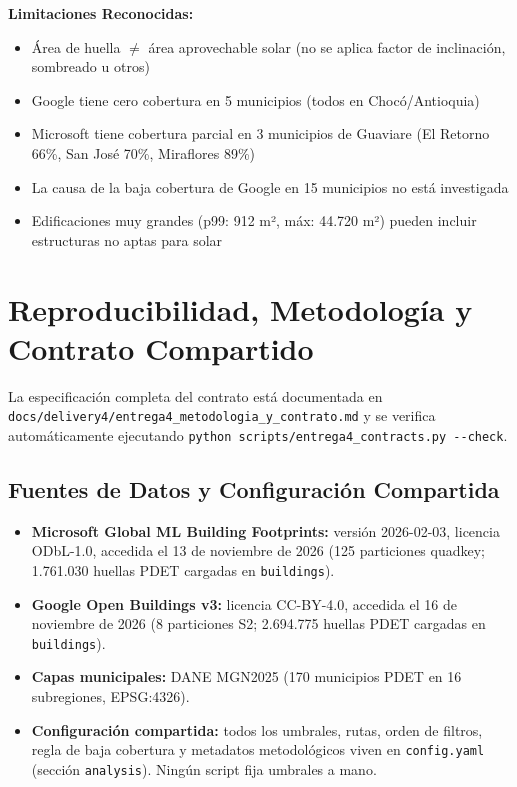 \documentclass[11pt, a4paper]{article}
\begin{document}
\textbf{Limitaciones Reconocidas:}
\begin{itemize}
    \item Área de huella $\neq$ área aprovechable solar (no se aplica factor de inclinación, sombreado u otros)
    \item Google tiene cero cobertura en 5 municipios (todos en Chocó/Antioquia)
    \item Microsoft tiene cobertura parcial en 3 municipios de Guaviare (El Retorno 66\%, San José 70\%, Miraflores 89\%)
    \item La causa de la baja cobertura de Google en 15 municipios no está investigada
    \item Edificaciones muy grandes (p99: 912 m², máx: 44.720 m²) pueden incluir estructuras no aptas para solar
\end{itemize}



\section{Reproducibilidad, Metodología y Contrato Compartido}

La especificación completa del contrato está documentada en \texttt{docs/delivery4/entrega4\_metodologia\_y\_contrato.md} y se verifica automáticamente ejecutando \texttt{python scripts/entrega4\_contracts.py -{}-check}.

\subsection{Fuentes de Datos y Configuración Compartida}

\begin{itemize}
    \item \textbf{Microsoft Global ML Building Footprints:} versión 2026-02-03, licencia ODbL-1.0, accedida el 13 de noviembre de 2026 (125 particiones quadkey; 1.761.030 huellas PDET cargadas en \texttt{buildings}).
    \item \textbf{Google Open Buildings v3:} licencia CC-BY-4.0, accedida el 16 de noviembre de 2026 (8 particiones S2; 2.694.775 huellas PDET cargadas en \texttt{buildings}).
    \item \textbf{Capas municipales:} DANE MGN2025 (170 municipios PDET en 16 subregiones, EPSG:4326).
    \item \textbf{Configuración compartida:} todos los umbrales, rutas, orden de filtros, regla de baja cobertura y metadatos metodológicos viven en \texttt{config.yaml} (sección \texttt{analysis}). Ningún script fija umbrales a mano.
\end{itemize}
\end{document}
